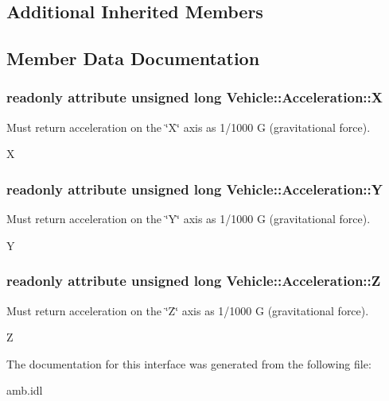 \subsection*{Additional Inherited Members}


\subsection{Member Data Documentation}
\hypertarget{interfaceVehicle_1_1Acceleration_a78edd942d1c1fadb20b2a527f3a3268a}{
\subsubsection[{X}]{\setlength{\rightskip}{0pt plus 5cm}readonly attribute unsigned long Vehicle\-::\-Acceleration\-::\-X}}\label{interfaceVehicle_1_1Acceleration_a78edd942d1c1fadb20b2a527f3a3268a}


Must return acceleration on the \char`\"{}\-X\char`\"{} axis as 1/1000 G (gravitational force). 

X \hypertarget{interfaceVehicle_1_1Acceleration_a962e62e042a2d28e43ed54ab6d9c70ca}{
\subsubsection[{Y}]{\setlength{\rightskip}{0pt plus 5cm}readonly attribute unsigned long Vehicle\-::\-Acceleration\-::\-Y}}\label{interfaceVehicle_1_1Acceleration_a962e62e042a2d28e43ed54ab6d9c70ca}


Must return acceleration on the \char`\"{}\-Y\char`\"{} axis as 1/1000 G (gravitational force). 

Y \hypertarget{interfaceVehicle_1_1Acceleration_ada14ed01098bb5a2767db58d7ca76d1b}{
\subsubsection[{Z}]{\setlength{\rightskip}{0pt plus 5cm}readonly attribute unsigned long Vehicle\-::\-Acceleration\-::\-Z}}\label{interfaceVehicle_1_1Acceleration_ada14ed01098bb5a2767db58d7ca76d1b}


Must return acceleration on the \char`\"{}\-Z\char`\"{} axis as 1/1000 G (gravitational force). 

Z 

The documentation for this interface was generated from the following file\-:\begin{DoxyCompactItemize}
\item 
amb.\-idl\end{DoxyCompactItemize}
